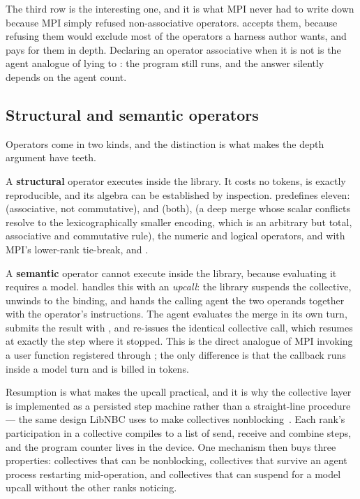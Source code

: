 The third row is the interesting one, and it is what MPI never had to write
down because MPI simply refused non-associative operators.  \ampi{} accepts
them, because refusing them would exclude most of the operators a harness
author wants, and pays for them in depth.  Declaring an operator associative
when it is not is the agent analogue of lying to : the
program still runs, and the answer silently depends on the agent count.

\subsection{Structural and semantic operators}

Operators come in two kinds, and the distinction is what makes the depth
argument have teeth.

A \textbf{structural} operator executes inside the library.  It costs no
tokens, is exactly reproducible, and its algebra can be established by
inspection.  \ampi{} predefines eleven:  (associative, not
commutative),  and  (both), 
(a deep merge whose scalar conflicts resolve to the lexicographically smaller
encoding, which is an arbitrary but total, associative and commutative rule),
the numeric and logical operators,  and 
with MPI's lower-rank tie-break, and .

A \textbf{semantic} operator cannot execute inside the library, because
evaluating it requires a model.  \ampi{} handles this with an
\emph{upcall}: the library suspends the collective, unwinds to the binding, and
hands the calling agent the two operands together with the operator's
instructions.  The agent evaluates the merge in its own turn, submits the
result with , and re-issues the identical collective call,
which resumes at exactly the step where it stopped.  This is the direct
analogue of MPI invoking a user function registered through
; the only difference is that the callback runs inside a
model turn and is billed in tokens.

Resumption is what makes the upcall practical, and it is why the collective
layer is implemented as a persisted step machine rather than a straight-line
procedure --- the same design LibNBC uses to make collectives
nonblocking~\cite{hoefler2007nbc}.  Each rank's participation in a collective
compiles to a list of send, receive and combine steps, and the program counter
lives in the device.  One mechanism then buys three properties: collectives
that can be nonblocking, collectives that survive an agent process restarting
mid-operation, and collectives that can suspend for a model upcall without the
other ranks noticing.

